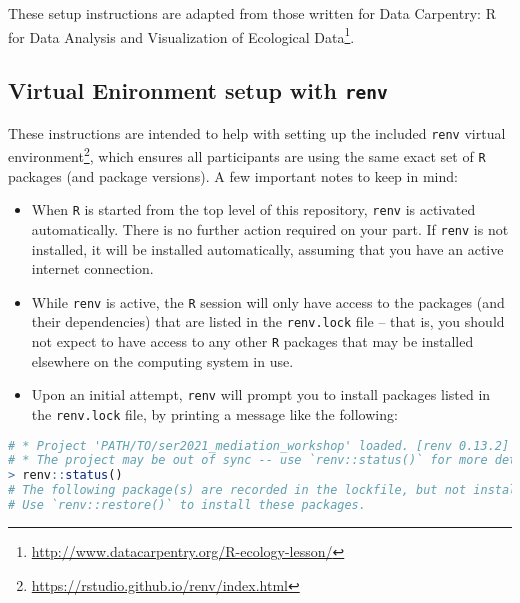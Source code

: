 \documentclass[
  12pt,
]{book}
\newcommand{\passthrough}[1]{#1}
\providecommand{\tightlist}{%
  \setlength{\itemsep}{0pt}\setlength{\parskip}{0pt}}
\renewcommand{\href}[2]{#2\footnote{\url{#1}}}
\theoremstyle{definition}
\theoremstyle{definition}
\theoremstyle{definition}
\newcommand{\1}{\mathbbm{1}}
\begin{document}
These setup instructions are adapted from those written for \href{http://www.datacarpentry.org/R-ecology-lesson/}{Data Carpentry: R
for Data Analysis and Visualization of Ecological
Data}.

\hypertarget{renv}{%
\subsection{\texorpdfstring{Virtual Enironment setup with \texttt{renv}}{Virtual Enironment setup with renv}}\label{renv}}

These instructions are intended to help with setting up the included \href{https://rstudio.github.io/renv/index.html}{\passthrough{\lstinline!renv!}
virtual environment}, which ensures
all participants are using the same exact set of \passthrough{\lstinline!R!} packages (and package
versions). A few important notes to keep in mind:

\begin{itemize}
\tightlist
\item
  When \passthrough{\lstinline!R!} is started from the top level of this repository, \passthrough{\lstinline!renv!} is
  activated automatically. There is no further action required on your part. If
  \passthrough{\lstinline!renv!} is not installed, it will be installed automatically, assuming that you
  have an active internet connection.
\item
  While \passthrough{\lstinline!renv!} is active, the \passthrough{\lstinline!R!} session will only have access to the packages
  (and their dependencies) that are listed in the \passthrough{\lstinline!renv.lock!} file -- that is,
  you should not expect to have access to any other \passthrough{\lstinline!R!} packages that may be
  installed elsewhere on the computing system in use.
\item
  Upon an initial attempt, \passthrough{\lstinline!renv!} will prompt you to install packages listed in
  the \passthrough{\lstinline!renv.lock!} file, by printing a message like the following:
\end{itemize}

\begin{lstlisting}[language=R]
# * Project 'PATH/TO/ser2021_mediation_workshop' loaded. [renv 0.13.2]
# * The project may be out of sync -- use `renv::status()` for more details.
> renv::status()
# The following package(s) are recorded in the lockfile, but not installed:
# Use `renv::restore()` to install these packages.
\end{lstlisting}
\end{document}
